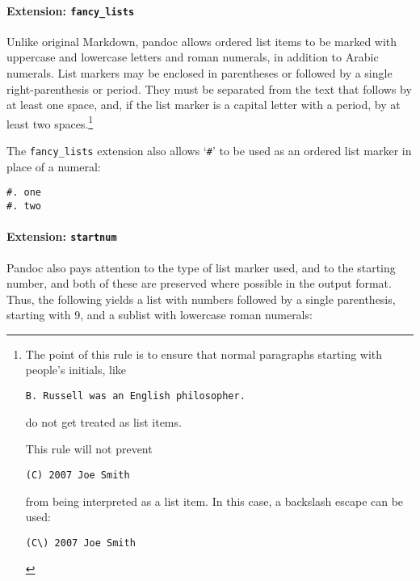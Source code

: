 \documentclass[
]{article}
\begin{document}
\paragraph{\texorpdfstring{Extension:
\texttt{fancy\_lists}}{Extension: fancy\_lists}}\label{extension-fancy_lists}

Unlike original Markdown, pandoc allows ordered list items to be marked
with uppercase and lowercase letters and roman numerals, in addition to
Arabic numerals. List markers may be enclosed in parentheses or followed
by a single right-parenthesis or period. They must be separated from the
text that follows by at least one space, and, if the list marker is a
capital letter with a period, by at least two spaces.\footnote{The point
  of this rule is to ensure that normal paragraphs starting with
  people's initials, like

\begin{Verbatim}
B. Russell was an English philosopher.
\end{Verbatim}

  do not get treated as list items.

  This rule will not prevent

\begin{Verbatim}
(C) 2007 Joe Smith
\end{Verbatim}

  from being interpreted as a list item. In this case, a backslash
  escape can be used:

\begin{Verbatim}
(C\) 2007 Joe Smith
\end{Verbatim}
}

The \texttt{fancy\_lists} extension also allows `\texttt{\#}' to be used
as an ordered list marker in place of a numeral:

\begin{verbatim}
#. one
#. two
\end{verbatim}

\paragraph{\texorpdfstring{Extension:
\texttt{startnum}}{Extension: startnum}}\label{extension-startnum}

Pandoc also pays attention to the type of list marker used, and to the
starting number, and both of these are preserved where possible in the
output format. Thus, the following yields a list with numbers followed
by a single parenthesis, starting with 9, and a sublist with lowercase
roman numerals:
\end{document}
